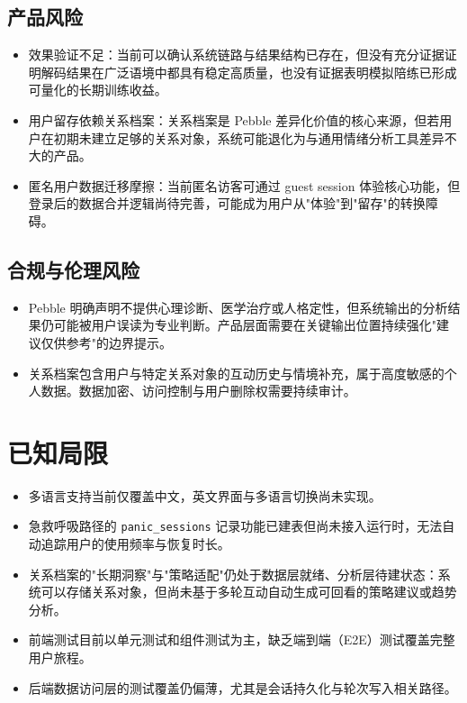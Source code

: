 \subsection{产品风险}

\begin{itemize}
  \item 效果验证不足：当前可以确认系统链路与结果结构已存在，但没有充分证据证明解码结果在广泛语境中都具有稳定高质量，也没有证据表明模拟陪练已形成可量化的长期训练收益。
  \item 用户留存依赖关系档案：关系档案是 Pebble 差异化价值的核心来源，但若用户在初期未建立足够的关系对象，系统可能退化为与通用情绪分析工具差异不大的产品。
  \item 匿名用户数据迁移摩擦：当前匿名访客可通过 guest session 体验核心功能，但登录后的数据合并逻辑尚待完善，可能成为用户从"体验"到"留存"的转换障碍。
\end{itemize}

\subsection{合规与伦理风险}

\begin{itemize}
  \item Pebble 明确声明不提供心理诊断、医学治疗或人格定性，但系统输出的分析结果仍可能被用户误读为专业判断。产品层面需要在关键输出位置持续强化"建议仅供参考"的边界提示。
  \item 关系档案包含用户与特定关系对象的互动历史与情境补充，属于高度敏感的个人数据。数据加密、访问控制与用户删除权需要持续审计。
\end{itemize}

\section{已知局限}

\begin{itemize}
  \item 多语言支持当前仅覆盖中文，英文界面与多语言切换尚未实现。
  \item 急救呼吸路径的 \texttt{panic\_sessions} 记录功能已建表但尚未接入运行时，无法自动追踪用户的使用频率与恢复时长。
  \item 关系档案的"长期洞察"与"策略适配"仍处于数据层就绪、分析层待建状态：系统可以存储关系对象，但尚未基于多轮互动自动生成可回看的策略建议或趋势分析。
  \item 前端测试目前以单元测试和组件测试为主，缺乏端到端（E2E）测试覆盖完整用户旅程。
  \item 后端数据访问层的测试覆盖仍偏薄，尤其是会话持久化与轮次写入相关路径。
\end{itemize}

